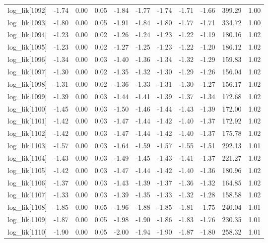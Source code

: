 \begin{table}[ht]
\begin{tabular}{rrrrrrrrrrr}
  log\_lik[1092] & -1.74 & 0.00 & 0.05 & -1.84 & -1.77 & -1.74 & -1.71 & -1.66 & 399.29 & 1.00 \\ 
  log\_lik[1093] & -1.80 & 0.00 & 0.05 & -1.91 & -1.84 & -1.80 & -1.77 & -1.71 & 334.72 & 1.00 \\ 
  log\_lik[1094] & -1.23 & 0.00 & 0.02 & -1.26 & -1.24 & -1.23 & -1.22 & -1.19 & 180.16 & 1.02 \\ 
  log\_lik[1095] & -1.23 & 0.00 & 0.02 & -1.27 & -1.25 & -1.23 & -1.22 & -1.20 & 186.12 & 1.02 \\ 
  log\_lik[1096] & -1.34 & 0.00 & 0.03 & -1.40 & -1.36 & -1.34 & -1.32 & -1.29 & 159.83 & 1.02 \\ 
  log\_lik[1097] & -1.30 & 0.00 & 0.02 & -1.35 & -1.32 & -1.30 & -1.29 & -1.26 & 156.04 & 1.02 \\ 
  log\_lik[1098] & -1.31 & 0.00 & 0.02 & -1.36 & -1.33 & -1.31 & -1.30 & -1.27 & 156.17 & 1.02 \\ 
  log\_lik[1099] & -1.39 & 0.00 & 0.03 & -1.44 & -1.41 & -1.39 & -1.37 & -1.34 & 172.68 & 1.02 \\ 
  log\_lik[1100] & -1.45 & 0.00 & 0.03 & -1.50 & -1.46 & -1.44 & -1.43 & -1.39 & 172.00 & 1.02 \\ 
  log\_lik[1101] & -1.42 & 0.00 & 0.03 & -1.47 & -1.44 & -1.42 & -1.40 & -1.37 & 172.92 & 1.02 \\ 
  log\_lik[1102] & -1.42 & 0.00 & 0.03 & -1.47 & -1.44 & -1.42 & -1.40 & -1.37 & 175.78 & 1.02 \\ 
  log\_lik[1103] & -1.57 & 0.00 & 0.03 & -1.64 & -1.59 & -1.57 & -1.55 & -1.51 & 292.13 & 1.01 \\ 
  log\_lik[1104] & -1.43 & 0.00 & 0.03 & -1.49 & -1.45 & -1.43 & -1.41 & -1.37 & 221.27 & 1.02 \\ 
  log\_lik[1105] & -1.42 & 0.00 & 0.03 & -1.47 & -1.44 & -1.42 & -1.40 & -1.36 & 180.96 & 1.02 \\ 
  log\_lik[1106] & -1.37 & 0.00 & 0.03 & -1.43 & -1.39 & -1.37 & -1.36 & -1.32 & 164.85 & 1.02 \\ 
  log\_lik[1107] & -1.33 & 0.00 & 0.03 & -1.39 & -1.35 & -1.33 & -1.32 & -1.28 & 158.58 & 1.02 \\ 
  log\_lik[1108] & -1.85 & 0.00 & 0.05 & -1.96 & -1.88 & -1.85 & -1.81 & -1.75 & 240.04 & 1.01 \\ 
  log\_lik[1109] & -1.87 & 0.00 & 0.05 & -1.98 & -1.90 & -1.86 & -1.83 & -1.76 & 230.35 & 1.01 \\ 
  log\_lik[1110] & -1.90 & 0.00 & 0.05 & -2.00 & -1.94 & -1.90 & -1.87 & -1.80 & 258.32 & 1.01 \\ 

\end{tabular}
\end{table}
